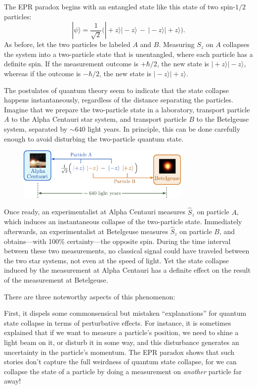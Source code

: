\documentclass[pra,12pt]{revtex4}
\begin{document}
The EPR paradox begins with an entangled state like this state of two
spin-$1/2$ particles:
\begin{equation}
  |\psi\rangle = \frac{1}{\sqrt{2}} \Big(|\!+\!z\rangle|\!-\!z\rangle \,-\, |\!-\!z\rangle|\!+\!z\rangle\Big).
\end{equation}
As before, let the two particles be labeled $A$ and $B$.  Measuring
$S_z$ on $A$ collapses the system into a two-particle state that is
unentangled, where each particle has a definite spin.  If the
measurement outcome is $+\hbar/2$, the new state is $|\!+\!z\rangle
|\!-\!z\rangle$, whereas if the outcome is $-\hbar/2$, the new state
is $|\!-\!z\rangle|\!+\!z\rangle$.

The postulates of quantum theory seem to indicate that the state
collapse happens instantaneously, regardless of the distance
separating the particles.  Imagine that we prepare the two-particle
state in a laboratory, transport particle $A$ to the Alpha Centauri
star system, and transport particle $B$ to the Betelgeuse system,
separated by $\sim 640$ light years.  In principle, this can be done
carefully enough to avoid disturbing the two-particle quantum state.

\begin{figure}[h]
  \centering\includegraphics[width=0.75\textwidth]{epr}
\end{figure}

Once ready, an experimentalist at Alpha Centauri measures $\hat{S}_z$
on particle $A$, which induces an instantaneous collapse of the
two-particle state.  Immediately afterwards, an experimentalist at
Betelgeuse measures $\hat{S}_z$ on particle $B$, and obtains---with
100\% certainty---the opposite spin.  During the time interval between
these two measurements, no classical signal could have traveled
between the two star systems, not even at the speed of light.  Yet
the state collapse induced by the measurement at Alpha Centauri has a
definite effect on the result of the measurement at Betelgeuse.

There are three noteworthy aspects of this phenomenon:

First, it dispels some commonsensical but mistaken ``explanations''
for quantum state collapse in terms of perturbative effects.  For
instance, it is sometimes explained that if we want to measure a
particle's position, we need to shine a light beam on it, or disturb
it in some way, and this disturbance generates an uncertainty in the
particle's momentum.  The EPR paradox shows that such stories don't
capture the full weirdness of quantum state collapse, for we can
collapse the state of a particle by doing a measurement on
\textit{another} particle far away!
\end{document}
